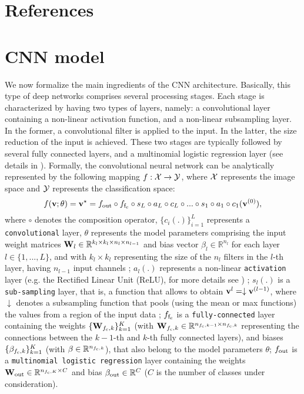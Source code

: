 \documentclass[5p,time]{elsarticle}
\begin{document}
\section*{References}




\appendix

\section{CNN model}
\label{sec:CNN-model}

We now formalize the main ingredients of the CNN architecture.
Basically, this type of deep networks comprises several processing
stages. Each stage is characterized by having two types of layers,
namely: a convolutional layer containing a non-linear activation
function, and a non-linear subsampling layer. In the former, a
convolutional filter is applied to the input. In the latter, the
size reduction of the input is achieved. These two stages are
typically followed by several fully connected layers, and a
multinomial logistic regression layer (see details in
\cite{KrizhevskyNIPS2012}). Formally, the convolutional neural
network can be analytically represented by the following mapping
$f:{\cal X}\rightarrow {\cal Y}$, where ${\cal X}$ represents the
image space and ${\cal Y}$ represents the classification space:
\begin{equation}
f({\bf v}; \theta) = {\bf v}^{\star}=
f_{\rm out}\circ f_{\rm f_{c}} \circ s_{L} \circ a_L \circ c_L \circ ... \circ s_1 \circ a_1 \circ c_1({\bf v}^{(0)}),\label{eq:CNN1}
\end{equation}
where $\circ$ denotes the composition operator, $\{c_i(.)\}_{i=1}^L$ represents a \texttt{convolutional} layer, $\theta$ represents the model parameters
comprising the input weight matrices ${\bf W}_l\in\mathbb{R}^{k_l\times k_l\times n_l\times n_{l-1}}$ and bias vector $\beta_l\in\mathbb{R}^{n_l}$  for each layer
$l\in\{1,...,L\}$, and with $k_l\times k_l$ representing the size of the $n_l$ filters in the $l$-th layer, having $n_{l-1}$ input channels ;
$a_{l}(.)$ represents a non-linear \texttt{activation} layer (e.g. the Rectified Linear Unit (ReLU), for more details see \cite{KrizhevskyNIPS2012}) ; $s_{l}(.)$ is a \texttt{sub-sampling} layer, that is, a function that allows to obtain ${\bf v}^{l}= \downarrow {\bf v}^{(l-1)}$, where $\downarrow$ denotes a subsampling function that pools (using the mean or max functions) the values from a region of the input data ; $f_{\rm f_{c}}$ is a \texttt{fully-connected} layer containing the weights $\{{\bf W}_{f_{\rm c},k}\}_{k=1}^K$ (with  ${\bf W}_{f_{\rm c},k}\in\mathbb{R}^{n_{{f_{\rm c}},k-1}\times n_{{f_{\rm c}},k}}$ representing the connections between the $k-1$-th and $k$-th fully connected layers), and biases  $\{{\beta}_{f_{\rm c},k}\}_{k=1}^K$
(with $\beta\in\mathbb{R}^{n_{f_{\rm c},k}}$), that also belong to the model parameters $\theta$; $f_{\rm out}$ is a \texttt{multinomial logistic regression} layer containing the weights ${\bf W}_{\rm out}\in\mathbb{R}^{n_{{f_{\rm c}},K}\times C}$ and bias $\beta_{\rm out}\in\mathbb{R}^{C}$ ($C$ is the number of classes under consideration).
\end{document}
